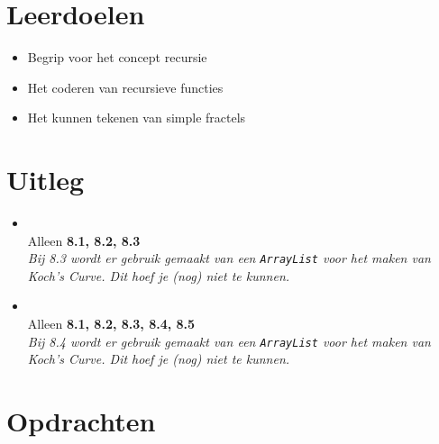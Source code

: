 \documentclass[../syllabus.tex]{subfiles}
\begin{document}
\section{Leerdoelen}
\begin{itemize}
    \item Begrip voor het concept recursie
    \item Het coderen van recursieve functies
    \item Het kunnen tekenen van simple fractels
\end{itemize}

\section{Uitleg}
\begin{itemize}
    \item {}\\
    Alleen \textbf{8.1, 8.2, 8.3}\\
    \textit{Bij 8.3 wordt er gebruik gemaakt van een \texttt{ArrayList} voor het maken van Koch's Curve. Dit hoef je (nog) niet te kunnen.}
    \item {}\\
    Alleen \textbf{8.1, 8.2, 8.3, 8.4, 8.5}\\
    \textit{Bij 8.4 wordt er gebruik gemaakt van een \texttt{ArrayList} voor het maken van Koch's Curve. Dit hoef je (nog) niet te kunnen.}
\end{itemize}

\newpage
\section{Opdrachten}
\end{document}

